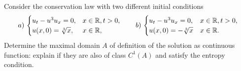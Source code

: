 \newpage
\begin{exercise}
    Consider the conservation law with two different initial conditions
    \begin{equation*}
        a)\,\begin{cases}
            u_t - u^3 u_x = 0, & x \in \mathbb{R}, t > 0, \\
            u(x,0) = \sqrt[3]{x}, & x \in \mathbb{R},
        \end{cases}
        \qquad 
        b)\,\begin{cases}
            u_t - u^3 u_x = 0, & x \in \mathbb{R}, t > 0, \\
            u(x,0) = -\sqrt[3]{x} & x \in \mathbb{R}.
        \end{cases}
    \end{equation*}
    Determine the maximal domain \(A\) of definition of the solution as continuous function: explain if they are also of class \(C^1(A)\) and satisfy the entropy condition.
\end{exercise}
